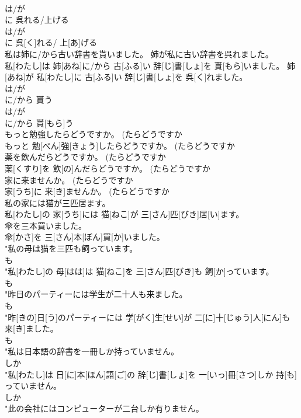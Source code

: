 \documentclass[8pt]{extreport}
\begin{document}
\begin{CJK}{UTF8}{min}
\\	は/が 
\\	に 呉れる/上げる	
\\	は/が 
\\	に 呉[く]れる/ 上[あ]げる
\\	私は姉に/から古い辞書を貰いました。 姉が私に古い辞書を呉れました。	
\\	私[わたし]は 姉[あね]に/から 古[ふる]い 辞[じ]書[しょ]を 貰[もら]いました。 姉[あね]が 私[わたし]に 古[ふる]い 辞[じ]書[しょ]を 呉[く]れました。
\\	は/が 
\\	に/から 貰う	
\\	は/が 
\\	に/から 貰[もら]う
\\	もっと勉強したらどうですか。 (たらどうですか 
\\	もっと 勉[べん]強[きょう]したらどうですか。 (たらどうですか 
\\	薬を飲んだらどうですか。 (たらどうですか 
\\	薬[くすり]を 飲[の]んだらどうですか。 (たらどうですか 
\\	家に来ませんか。 (たらどうですか 
\\	家[うち]に 来[き]ませんか。 (たらどうですか 
\\	私の家には猫が三匹居ます。	
\\	私[わたし]の 家[うち]には 猫[ねこ]が 三[さん]匹[びき]居[い]ます。
\\	傘を三本買いました。	
\\	傘[かさ]を 三[さん]本[ぼん]買[か]いました。
\\	"私の母は猫を三匹も飼っています。 
\\	も 
\\	"私[わたし]の 母[はは]は 猫[ねこ]を 三[さん]匹[びき]も 飼[か]っています。 
\\	も 
\\	"昨日のパーティーには学生が二十人も来ました。 
\\	も 
\\	"昨[きの]日[う]のパーティーには 学[がく]生[せい]が 二[に]十[じゅう]人[にん]も 来[き]ました。 
\\	も 
\\	"私は日本語の辞書を一冊しか持っていません。 
\\	しか 
\\	"私[わたし]は 日[に]本[ほん]語[ご]の 辞[じ]書[しょ]を 一[いっ]冊[さつ]しか 持[も]っていません。 
\\	しか 
\\	"此の会社にはコンピューターが二台しか有りません。 

\end{CJK}
\end{document}
